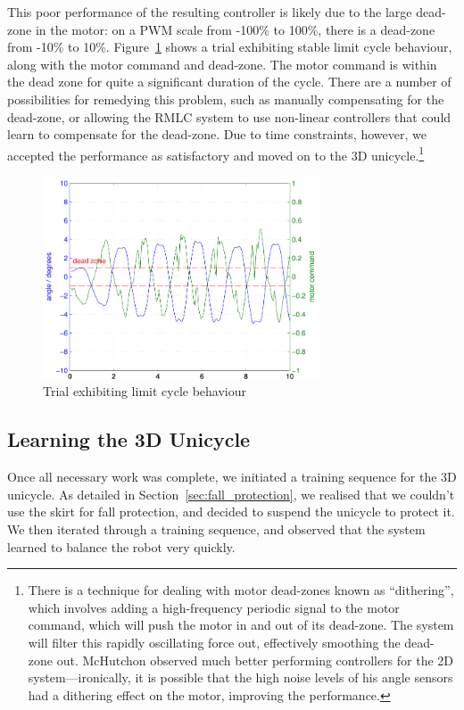 \documentclass{IIBproject}
\begin{document}
This poor performance of the resulting controller is likely due to the large
dead-zone in the motor: on a PWM scale from -100\% to 100\%, there is a
dead-zone from -10\% to 10\%. Figure~\ref{fig:limit_cycle} shows a trial
exhibiting stable limit cycle behaviour, along with the motor command and
dead-zone. The motor command is within the dead zone for quite a significant
duration of the cycle. There are a number of possibilities for remedying this
problem, such as manually compensating for the dead-zone, or allowing the RMLC
system to use non-linear controllers that could learn to compensate for the
dead-zone. Due to time constraints, however, we accepted the performance as
satisfactory and moved on to the 3D unicycle.\footnote{There is a technique
for dealing with motor dead-zones known as ``dithering'', which involves
adding a high-frequency periodic signal to the motor command, which will push
the motor in and out of its dead-zone. The system will filter this rapidly
oscillating force out, effectively smoothing the dead-zone out. McHutchon
observed much better performing controllers for the 2D system---ironically, it
is possible that the high noise levels of his angle sensors had a dithering
effect on the motor, improving the performance.}

\begin{figure}[htpb]
  \begin{center}
    \includegraphics[height=6cm]{2d_limit_cycle.pdf}
    \end{center}
    \caption{Trial exhibiting limit cycle behaviour}
    \label{fig:limit_cycle}
    \end{figure}

\subsection{Learning the 3D Unicycle}

Once all necessary work was complete, we initiated a training sequence for the
3D unicycle. As detailed in Section~\ref{sec:fall_protection}, we realised
that we couldn't use the skirt for fall protection, and decided to suspend the
unicycle to protect it. We then iterated through a training sequence, and
observed that the system learned to balance the robot very quickly.
\end{document}
